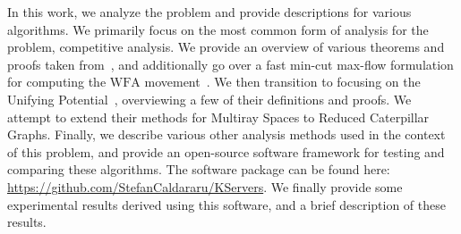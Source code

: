 In this work, we analyze the \KS problem and provide descriptions for various algorithms. We primarily focus on the most common form of analysis for the \KS problem, competitive analysis. We provide an overview of various theorems and proofs taken from~\cite{OnlineComp1998}, and additionally go over a fast min-cut max-flow formulation for computing the $\mathrm{WFA}$ movement~\cite{mcfp2011}. We then transition to focusing on the Unifying Potential~\cite{unifyingPotential2021}, overviewing a few of their definitions and proofs. We attempt to extend their methods for Multiray Spaces to Reduced Caterpillar Graphs. Finally, we describe various other analysis methods used in the context of this problem, and provide an open-source software framework for testing and comparing these algorithms. The software package can be found here: \url{https://github.com/StefanCaldararu/KServers}. We finally provide some experimental results derived using this software, and a brief description of these results.